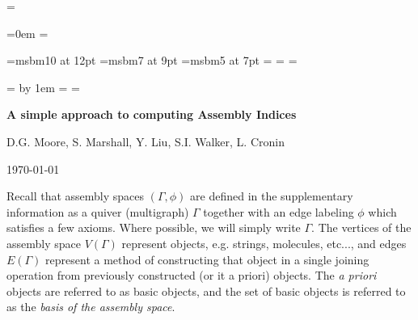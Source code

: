 

\newdimen\singlespace\relax\singlespace=\baselineskip
\newdimen\doublespace\relax{}\singlespace
\newdimen\triplespace\relax{}\singlespace

\def\startsinglespace{\baselineskip=\singlespace}
\def\startdoublespace{\baselineskip=\doublespace}

\parindent=0em
\parskip=\singlespace

\newfam\bbfam
\font\bbtwelve=msbm10 at 12pt
\font\bbnine=msbm7 at 9pt
\font\bbseven=msbm5 at 7pt
\textfont\bbfam=\bbtwelve
\scriptfont\bbfam=\bbnine
\scriptscriptfont\bbfam=\bbseven
\def\bb{\fam=\bbfam}

\def\powerset#1{{\cal P}(#1)}
\def\justbelow#1{\lfloor #1 \rfloor}
\def\downset#1{\downarrow\!#1}

\everyfootnote = {%
	\advance\parindent by 1em\relax
	\startsinglespace}
\interfootnoteskip=\singlespace
\let\footnote=\numberedfootnote

\def\truenull{\null\vskip-\baselineskip}
\def\noskip{\truenull\vskip-\baselineskip}
\def\trueskip#1{\noskip\vskip#1}

\def\tableword{Table}
\newbox\capbox
\newcount\tabnum
\def\table#1#2#3{
	\global\advance\tabnum by 1
	\begingroup
	\setbox\capbox = \vbox{
		\startsinglespace
		\leftskip=0pt plus 1fil
		\rightskip=\leftskip
		\parfillskip=0pt
		\noindent\tableword~\the\tabnum: #3
	}
	\vskip\singlespace
	\vbox{
		\hbox to \hsize{\hss#2\hss}
		\box\capbox
	}
	\trueskip\triplespace
	\endgroup
}

\begingroup
{}\baselineskip
\centerline{\bf A simple approach to computing Assembly Indices}
\centerline{D.G. Moore, S. Marshall, Y. Liu, S.I. Walker, L. Cronin}
\centerline{\today}
\endgroup

\baselineskip

Recall that assembly spaces $(\Gamma, \phi)$ are defined in the
supplementary information as a quiver (multigraph) $\Gamma$ together with
an edge labeling $\phi$ which satisfies a few axioms. Where possible,
we will simply write $\Gamma$. The vertices of the assembly space
$V(\Gamma)$ represent objects, e.g. strings, molecules, etc..., and
edges $E(\Gamma)$ represent a method of constructing that object in a
single joining operation from previously constructed (or {it a priori})
objects. The {\it a priori} objects are referred to as basic objects,
and the set of basic objects is referred to as the {\it basis of the
assembly space}.

